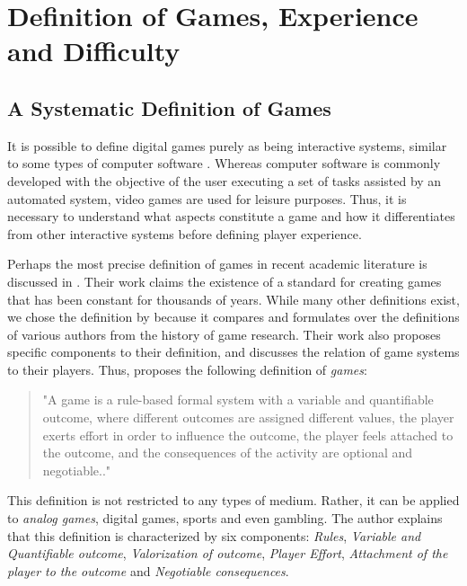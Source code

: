 \chapter {Definition of Games, Experience and Difficulty}

\section{A Systematic Definition of Games}

It is possible to define digital games purely as being interactive systems, similar to some types of computer software \cite{ARTICLE_FromUsabilityToPlayability}. Whereas computer software is commonly developed with the objective of the user executing a set of tasks assisted by an automated system, video games are used for leisure purposes. Thus, it is necessary to understand what aspects constitute a game and how it differentiates from other interactive systems before defining player experience.

Perhaps the most precise definition of games in recent academic literature is discussed in \cite{ARTICLE_TheGameThePlayerTheWorld}. Their work claims the existence of a standard for creating games that has been constant for thousands of years. While many other definitions exist, we chose the definition by \citeauthor{ARTICLE_TheGameThePlayerTheWorld} because it compares and formulates over the definitions of various authors from the history of game research. Their work also proposes specific components to their definition, and discusses the relation of game systems to their players. Thus, \citet{ARTICLE_TheGameThePlayerTheWorld} proposes the following definition of \emph{games}:

\begin{quotation}
"A game is a rule-based formal system with a variable and quantifiable outcome, where different outcomes are assigned different values, the player exerts effort in order to influence the outcome, the player feels attached to the outcome, and the consequences of the activity are optional and negotiable.."
\end{quotation}

This definition is not restricted to any types of medium. Rather, it can be applied to \emph{analog games}, digital games, sports and even gambling. The author explains that this definition is characterized by six components: \emph{Rules}, \emph{Variable and Quantifiable outcome}, \emph{Valorization of outcome}, \emph{Player Effort}, \emph{Attachment of the player to the outcome} and \emph{Negotiable consequences}.

